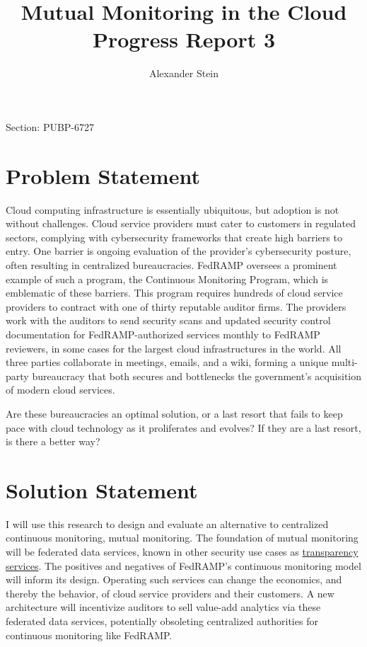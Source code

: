 \documentclass{jdf}
\begin{document}
Section: PUBP-6727
\title{Mutual Monitoring in the Cloud \\ Progress Report 3}
\author{Alexander Stein}

\maketitle
\thispagestyle{fancy}


\section*{Problem Statement}

Cloud computing infrastructure is essentially ubiquitous, but adoption is not without challenges. Cloud service providers must cater to customers in regulated sectors, complying with cybersecurity frameworks that create high barriers to entry. One barrier is ongoing evaluation of the provider's cybersecurity posture, often resulting in centralized bureaucracies. FedRAMP oversees a prominent example of such a program, the Continuous Monitoring Program, which is emblematic of these barriers. This program requires hundreds of cloud service providers to contract with one of thirty reputable auditor firms. The providers work with the auditors to send security scans and updated security control documentation for FedRAMP-authorized services monthly to FedRAMP reviewers, in some cases for the largest cloud infrastructures in the world. All three parties collaborate in meetings, emails, and a wiki, forming a unique multi-party bureaucracy that both secures and bottlenecks the government's acquisition of modern cloud services.

Are these bureaucracies an optimal solution, or a last resort that fails to keep pace with cloud technology as it proliferates and evolves? If they are a last resort, is there a better way?

\section*{Solution Statement}

I will use this research to design and evaluate an alternative to centralized continuous monitoring, mutual monitoring. The foundation of mutual monitoring will be federated data services, known in other security use cases as \hyperlink{https://transparency.dev}{transparency services}. The positives and negatives of FedRAMP's continuous monitoring model will inform its design. Operating such services can change the economics, and thereby the behavior, of cloud service providers and their customers. A new architecture will incentivize auditors to sell value-add analytics via these federated data services, potentially obsoleting centralized authorities for continuous monitoring like FedRAMP.
\end{document}
